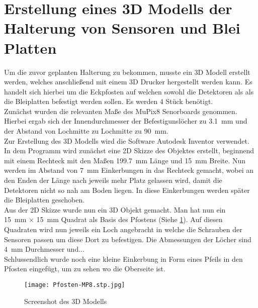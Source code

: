 \documentclass{article}
\begin{document}
 

\section*{Erstellung eines 3D Modells der Halterung von Sensoren und Blei Platten}


Um die zuvor geplanten Halterung zu bekommen, musste ein 3D Modell erstellt werden, welches anschließend mit einem 3D Drucker hergestellt werden kann. Es handelt sich hierbei um die Eckpfosten auf welchen sowohl die Detektoren als als die Bleiplatten befestigt werden sollen. Es werden 4 Stück benötigt. 
\\
\newline
Zunächst wurden die relevanten Maße des MuPix8 Senorboards genommen. 
Hierbei ergab sich der Innendurchmesser der Befestigunslöcher zu \SI{3,1}{mm} und der Abstand von Lochmitte zu Lochmitte zu \SI{90}{mm}.
\\
Zur Erstellung des 3D Modells wird die Software Autodesk Inventor verwendet. 
In dem Programm wird zunächst eine 2D Skizze des Objektes erstellt, beginnend mit einem Rechteck mit den Maßen \SI{199,7}{mm} Länge und \SI{15}{mm} Breite. 
Nun werden im Abstand von \SI{7}{mm} Einkerbungen in das Rechteck gemacht, wobei an den Enden der Länge nach jeweils mehr Platz gelassen wird, damit die Detektoren nicht so nah am Boden liegen. 
In diese Einkerbungen werden später die Bleiplatten geschoben. 
\\
Aus der 2D Skizze wurde nun ein 3D Objekt gemacht.
 Man hat nun ein\\ 
\SI{15}{mm} $\times$ \SI{15}{mm} Quadrat als Basis des Pfostens (Siehe \ref{fig:distance_piece}). 
Auf diesen Quadraten wird nun jeweils ein Loch angebracht in welche die Schrauben der Sensoren passen um diese Dort zu befestigen. 
Die Abmessungen der Löcher sind \SI{4}{mm} Durchmesser und... %
\\
Schlussendlich wurde noch eine kleine Einkerbung in Form eines Pfeils in den Pfosten eingefügt, um zu sehen wo die Oberseite ist. 

\begin{figure}[h]
    \centering
    \texttt{[image: Pfosten-MP8.stp.jpg]}
    \caption{ Screenshot des 3D Modells}
    \label{fig:distance_piece}
\end{figure}
\end{document}
